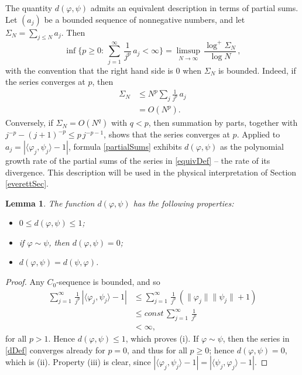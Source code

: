 \documentclass[twoside,11pt,letter]{article}
\theoremstyle{definition}
\theoremstyle{definition}
\theoremstyle{plain}
\newtheorem{lemma}[theorem]{Lemma}
\newenvironment{remark}[1][Remark.]{\begin{trivlist}
\item[\hskip \labelsep {\bfseries #1}]}{\end{trivlist}}
\begin{document}
\begin{remark}
The quantity $d(\varphi,\psi)$ admits an equivalent description in terms of partial sums. Let $(a_j)$ be a bounded sequence of nonnegative numbers, and let $\Sigma_N=\sum_{j\leq N}a_j$. Then
\begin{equation}\label{partialSums}
\inf\Big\{p\geq0:\:\sum_{j=1}^\infty\,\frac{1}{j^p}\,a_j<\infty\Big\}=\limsup_{N\to\infty}\,\frac{\log^+\Sigma_N}{\log N}\,,
\end{equation}
with the convention that the right hand side is $0$ when $\Sigma_N$ is bounded. Indeed, if the series converges at $p$, then
\begin{equation*}
\begin{split}
\Sigma_N&\leq N^p\sum_j \frac{1}{j^p}\,a_j \\
&=O(N^p).
\end{split}
\end{equation*}
Conversely, if $\Sigma_N=O(N^q)$ with $q<p$, then summation by parts, together with $j^{-p}-(j+1)^{-p}\leq p\,j^{-p-1}$, shows that the series converges at $p$. Applied to $a_j=|\langle\varphi_j,\psi_j\rangle-1|$, formula \eqref{partialSums} exhibits $d(\varphi,\psi)$ as the polynomial growth rate of the partial sums of the series in \eqref{equivDef} -- the rate of its divergence. This description will be used in the physical interpretation of Section \ref{everettSec}.
\end{remark}

\begin{lemma}\label{basicLem}
The function $d(\varphi,\psi)$ has the following properties:
\begin{itemize}
\item[(i)]{$0\leq d(\varphi,\psi)\leq 1$;}
\item[(ii)]{if $\varphi\sim\psi$, then $d(\varphi,\psi)=0$;}
\item[(iii)]{$d(\varphi,\psi)=d(\psi,\varphi)$.}
\end{itemize}
\end{lemma}
\begin{proof}
Any $C_0$-sequence is bounded, and so
\begin{equation*}
\begin{split}
\sum _{j=1}^\infty\,\frac{1}{j^p}\,|\langle \varphi_j,\psi_j\rangle-1|&\leq \sum _{j=1}^\infty\,\frac{1}{j^p}\,(\|\varphi_j\|\|\psi_j\|+1)\\
&\leq const\, \sum _{j=1}^\infty\,\frac{1}{j^p}\\
&<\infty,
\end{split}
\end{equation*}
for all $p>1$. Hence $d(\varphi,\psi)\leq 1$, which proves (i). If $\varphi\sim\psi$, then the series in \eqref{dDef} converges already for $p=0$, and thus for all $p\geq0$; hence $d(\varphi,\psi)=0$, which is (ii). Property (iii) is clear, since $|\langle\varphi_j,\psi_j\rangle-1|=|\langle\psi_j,\varphi_j\rangle-1|$.
\end{proof}
\end{document}
